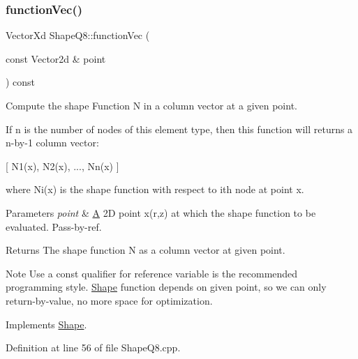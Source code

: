 \mbox{\label{class_shape_q8_a7e2de42658deff3c6912cc102b12cc96}} 
\subsubsection{\texorpdfstring{function\+Vec()}{functionVec()}}
{\footnotesize\ttfamily Vector\+Xd Shape\+Q8\+::function\+Vec (\begin{DoxyParamCaption}\item[{const Vector2d \&}]{point }\end{DoxyParamCaption}) const\hspace{0.3cm}{\ttfamily [virtual]}}



Compute the shape Function N in a column vector at a given point. 

If n is the number of nodes of this element type, then this function will returns a n-\/by-\/1 column vector\+:

\mbox{[} N1(x), N2(x), ..., Nn(x) \mbox{]}

where Ni(x) is the shape function with respect to ith node at point x.


\begin{DoxyParams}{Parameters}
{\em point} & \mbox{\hyperlink{class_a}{A}} 2D point x(r,z) at which the shape function to be evaluated. Pass-\/by-\/ref. \\
\hline
\end{DoxyParams}
\begin{DoxyReturn}{Returns}
The shape function N as a column vector at given point.
\end{DoxyReturn}
\begin{DoxyNote}{Note}
Use a const qualifier for reference variable is the recommended programming style. \mbox{\hyperlink{class_shape}{Shape}} function depends on given point, so we can only return-\/by-\/value, no more space for optimization. 
\end{DoxyNote}


Implements \mbox{\hyperlink{class_shape_a0e0400bca54c29b5097c84ace51ecc7b}{Shape}}.



Definition at line 56 of file Shape\+Q8.\+cpp.

\mbox{\label{class_shape_q8_a197f1e2109c7ee6c29d27198c96928a4}} 
